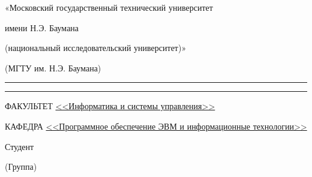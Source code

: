 \begin{titlepage}
\begin{minipage}{0.8\textwidth}
«Московский государственный технический университет

имени Н.Э. Баумана

(национальный исследовательский университет)»

(МГТУ им. Н.Э. Баумана)

\end{minipage}

{\vspace{5pt}
\rule{\linewidth}{3pt}

\par
\rule[20pt]{\linewidth}{1pt}
}


{\footnotesize

ФАКУЛЬТЕТ
\uline{\hfill
<<Информатика и системы управления>>\hfill}

\bigskip

КАФЕДРА
\uline{\hfill
<<Программное обеспечение ЭВМ и информационные технологии>>\hfill}
}

\bigskip

\bigskip

\bigskip

\begin{center}
\fontsize{16}{14}

\textbf{\wtype}

\ifx\wthemea\undefined%
\bigskip
\else%
\uline{\hfill\wthemea\hfill}
\fi

\ifx\wthemeb\undefined%
\bigskip
\else%
\uline{\hfill\wthemeb\hfill}
\fi

\ifx\wthemec\undefined%
\bigskip
\else%
\uline{\hfill\wthemec\hfill}
\fi

\ifx\wthemed\undefined%
\bigskip
\else%
\uline{\hfill\wthemed\hfill}
\fi

\ifx\wthemee\undefined%
\bigskip
\else%
\uline{\hfill\wthemee\hfill}
\fi

\ifx\wthemef\undefined%
\bigskip
\else%
\uline{\hfill\wthemef\hfill}
\fi


\end{center}

\bigskip

\bigskip

\begin{adjustbox}{minipage=0.35\textwidth,valign=T}
    \begin{flushleft}
        \footnotesize
        Студент
        \uline{\hfill\wgroup\hfill}

        \hfill
        (Группа)
        \hspace{0.25\textwidth}


\end{flushleft}
\end{adjustbox}
\end{titlepage}
